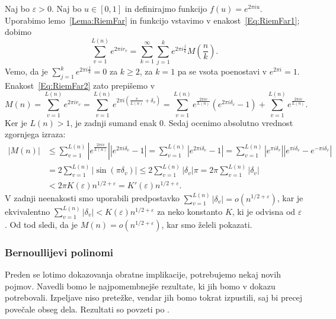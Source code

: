 \documentclass[mat1]{fmfdelo}
\begin{document}
Naj bo $\varepsilon > 0$. Naj bo $u \in [0,1]$ in definirajmo funkcijo $f(u) = e^{2\pi iu}$. Uporabimo lemo~\ref{Lema:RiemFar} in funkcijo vstavimo v enakost~\eqref{Eq:RiemFar1}; dobimo
\begin{equation}
\label{Eq:RiemFar2}
	\sum_{v=1}^{L(n)} e^{2\pi i r_{v}} = \sum_{k=1}^{\infty} \sum_{j=1}^{k} e^{2\pi i \frac{j}{k}} M \left(\frac{n}{k} \right).
\end{equation}
Vemo, da je $\sum_{j=1}^{k} e^{2\pi i \frac{j}{k}} = 0$ za $k \geq 2$, za $k=1$ pa se vsota poenostavi v $e^{2\pi i} = 1$.
Enakost~\eqref{Eq:RiemFar2} zato prepišemo v 
\[ M(n) = \sum_{v=1}^{L(n)} e^{2\pi i r_{v}} = \sum_{v=1}^{L(n)} e^{2\pi i \left(\frac{v}{L(n)} + \delta_{v} \right)} 
	   = \sum_{v=1}^{L(n)} e^{ \frac{2\pi i v}{L(n)} } \left(e^{2\pi i \delta_{v}} - 1 \right) + \sum_{v=1}^{L(n)} e^{ \frac{2\pi iv}{L(n)} }. \]
Ker je $L(n) > 1$, je zadnji sumand enak $0$. Sedaj ocenimo absolutno vrednost zgornjega izraza:
\begin{align*} 
|M(n)| &\leq \sum_{v=1}^{L(n)} \left|e^{ \frac{2\pi i v}{L(n)} } \right| \left|e^{2\pi i \delta_{v}} - 1 \right| 
	= \sum_{v=1}^{L(n)} \left|e^{2\pi i \delta_{v}} - 1 \right|
	= \sum_{v=1}^{L(n)} \left|e^{\pi i \delta_{v} } \right| \left|e^{\pi i \delta_{v}} - e^{-\pi i \delta_{v}}\right| \\
	&= 2 \sum_{v=1}^{L(n)} |\sin{(\pi \delta_{v})}| \leq 2 \sum_{v=1}^{L(n)} |\delta_{v}| \pi = 2 \pi \sum_{v=1}^{L(n)} |\delta_{v}| \\
	&< 2 \pi K(\varepsilon) n^{1/2 + \varepsilon} = K'(\varepsilon) n^{1/2 + \varepsilon}.
\end{align*}
V zadnji neenakosti smo uporabili predpostavko $ \sum_{v=1}^{L(n)}|\delta_{v}| = o(n^{1/2+\varepsilon}) $, kar je ekvivalentno 
$ \sum_{v=1}^{L(n)}|\delta_{v}| < K(\varepsilon) n^{1/2+\varepsilon}$ za neko konstanto $K$, ki je odvisna od $\varepsilon$.
Od tod sledi, da je $M(n) = o(n^{1/2 + \varepsilon})$, kar smo želeli pokazati.

\subsubsection{Bernoullijevi polinomi}

Preden se lotimo dokazovanja obratne implikacije, potrebujemo nekaj novih pojmov. Navedli bomo le najpomembnejše rezultate, ki jih bomo v dokazu potrebovali. Izpeljave niso pretežke, vendar jih bomo tokrat izpustili, saj bi precej povečale obseg dela. Rezultati so povzeti po \cite[poglavje 6.2]{zetafunction}.
\end{document}
